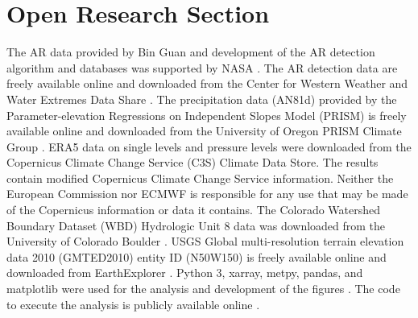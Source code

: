 \documentclass[draft]{agujournal2019}
\begin{document}
%
%

\section*{Open Research Section}

The AR data provided by Bin Guan and development of the AR detection algorithm and databases was supported by NASA \cite{Guan2022GlobalDataset}. The  AR detection data are freely available online and downloaded from the Center for Western Weather and Water Extremes Data Share \cite{Rutz2014RutzDataset}. The precipitation data (AN81d) provided by the Parameter-elevation Regressions on Independent Slopes Model (PRISM) is freely available online and downloaded from the University of Oregon PRISM Climate Group \cite{PRISMClimateGroup2004PRISMData}. ERA5 data on single levels \cite{Hersbach2018a} and pressure levels \cite{Hersbach2018} were downloaded from the Copernicus Climate Change Service (C3S) Climate Data Store. The results contain modified Copernicus Climate Change Service information. Neither the European Commission nor ECMWF is responsible for any use that may be made of the Copernicus information or data it contains. The Colorado Watershed Boundary Dataset (WBD) Hydrologic Unit 8 data was downloaded from the University of Colorado Boulder \cite{U.S.GeologicalSurvey2015ColoradoDataset}. USGS Global multi-resolution terrain elevation data 2010 (GMTED2010) entity ID (N50W150) is freely available online and downloaded from EarthExplorer \cite{Danielson2011GlobalDataset}. Python 3, xarray, metpy, pandas, and matplotlib were used for the analysis and development of the figures \cite{thomas_a_caswell_2022_6982547, 
 May2017, metpy, hoyer2017xarray, xarray_v2022.12.0, Hunter:2007, the_pandas_development_team_2022_7344967, VanRossum2009}. The code to execute the analysis is publicly available online \cite{Nash2024Dlnash/CO_top-decile_precipitation_ARs:Software}. 
\end{document}
